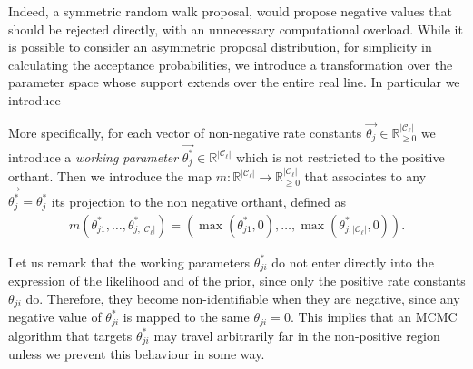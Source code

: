 \documentclass[pdflatex,sn-mathphys-num]{sn-jnl}%
\theoremstyle{thmstyleone}%
\theoremstyle{thmstyletwo}%
\theoremstyle{thmstylethree}%
\begin{document}
Indeed, a symmetric random walk proposal, would propose negative values that should be rejected directly, with an unnecessary computational overload.  While it is possible to consider an asymmetric proposal distribution, for simplicity in calculating the acceptance probabilities, we introduce a transformation over the parameter space whose support extends over the entire real line. In particular we introduce 






 


\noindent More specifically, for each vector of non-negative rate constants $\overrightarrow{\theta_{j}} \in \mathbb{R}_{\geq0}^{\left| \mathcal{C}_{\ell} \right|}$ we introduce a \emph{working parameter} $\overrightarrow{\theta_{j}^*}\in \mathbb{R}^{\left| \mathcal{C}_{\ell} \right|}$ which is not restricted to the positive orthant. Then we introduce the map $m: \mathbb{R}^{\left| \mathcal{C}_{\ell} \right| } \rightarrow \mathbb{R}_{\geq0}^{\left| \mathcal{C}_{\ell} \right|}$ that associates to any $\overrightarrow{\theta_{j}^*}=\theta_{j}^*$ its projection to the non negative orthant, defined as 
\begin{equation}
    \begin{aligned}
        m\left(\theta_{j1}^*, \dots, \theta_{j,\left|\mathcal{C}_{\ell} \right|}^*\right)= \left( \max\left(\theta_{j1}^*,0\right), \dots, \max\left(\theta_{j,\left|\mathcal{C}_{\ell} \right|}^*,0\right)\right) .
\label{def:transfer_theta_m_fn}
    \end{aligned}
\end{equation}




Let us remark that the working parameters $\theta_{ji}^*$ do not enter directly into the expression of the likelihood and of the prior, since only the positive rate constants $\theta_{ji}$ do. Therefore, they become non-identifiable when they are negative, since any negative value of $\theta_{ji}^*$ is mapped to the same $\theta_{ji}=0$. This implies that an MCMC algorithm that targets $\theta_{ji}^ *$ may travel arbitrarily far in the non-positive region unless we prevent this behaviour in some way.
\end{document}
